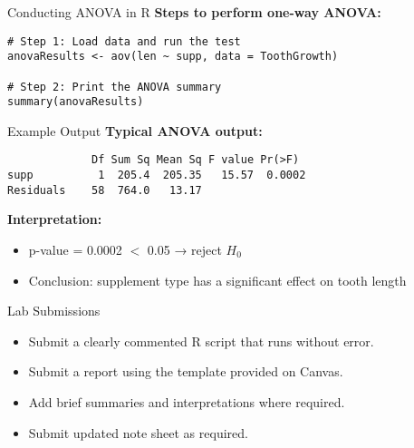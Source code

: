 \documentclass{beamer}
\begin{document}
\begin{frame}[fragile]{Conducting ANOVA in R}
\textbf{Steps to perform one-way ANOVA:}
\begin{verbatim}
# Step 1: Load data and run the test
anovaResults <- aov(len ~ supp, data = ToothGrowth)

# Step 2: Print the ANOVA summary
summary(anovaResults)
\end{verbatim}
\end{frame}

\begin{frame}[fragile]{Example Output}
\textbf{Typical ANOVA output:}
\begin{verbatim}
             Df Sum Sq Mean Sq F value Pr(>F)
supp          1  205.4  205.35   15.57  0.0002
Residuals    58  764.0   13.17
\end{verbatim}
\textbf{Interpretation:}
\begin{itemize}
    \item p-value = 0.0002 $<$ 0.05 → reject \( H_0 \)
    \item Conclusion: supplement type has a significant effect on tooth length
\end{itemize}
\end{frame}

\begin{frame}{Lab Submissions}
\begin{itemize}
    \item Submit a clearly commented R script that runs without error.
    \item Submit a report using the template provided on Canvas.
    \item Add brief summaries and interpretations where required.
    \item Submit updated note sheet as required.
\end{itemize}
\end{frame}
\end{document}
